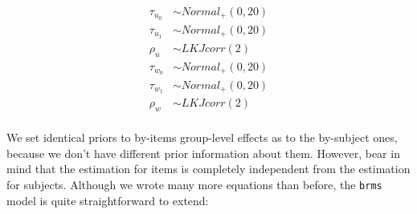 \documentclass[12pt,]{krantz}
\theoremstyle{definition}
\theoremstyle{definition}
\theoremstyle{definition}
\theoremstyle{remark}
\begin{document}
\begin{equation}
\begin{aligned}
\tau_{u_0} &\sim Normal_+(0,20)\\
\tau_{u_1} &\sim Normal_+(0,20)\\
\rho_u &\sim LKJcorr(2) \\
\tau_{w_0} &\sim Normal_+(0,20)\\
\tau_{w_1} &\sim Normal_+(0,20)\\
\rho_w &\sim LKJcorr(2) \\
\end{aligned}
\end{equation}

We set identical priors to by-items group-level effects as to the by-subject ones, because we don't have different prior information about them. However, bear in mind that the estimation for items is completely independent from the estimation for subjects. Although we wrote many more equations than before, the \texttt{brms} model is quite straightforward to extend:
\end{document}
